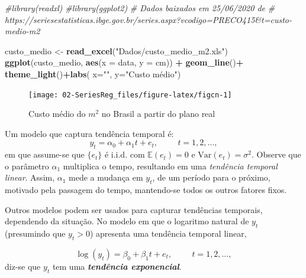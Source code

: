 \documentclass[
]{book}
\newenvironment{Shaded}{\begin{snugshade}}{\end{snugshade}}
\newcommand{\CommentTok}[1]{\textcolor[rgb]{0.56,0.35,0.01}{\textit{#1}}}
\newcommand{\DataTypeTok}[1]{\textcolor[rgb]{0.13,0.29,0.53}{#1}}
\newcommand{\KeywordTok}[1]{\textcolor[rgb]{0.13,0.29,0.53}{\textbf{#1}}}
\newcommand{\NormalTok}[1]{#1}
\newcommand{\OperatorTok}[1]{\textcolor[rgb]{0.81,0.36,0.00}{\textbf{#1}}}
\newcommand{\StringTok}[1]{\textcolor[rgb]{0.31,0.60,0.02}{#1}}
\theoremstyle{definition}
\theoremstyle{definition}
\theoremstyle{definition}
\theoremstyle{remark}
\begin{document}
\begin{Shaded}
\begin{Highlighting}[]
\CommentTok{#library(readxl)}
\CommentTok{#library(ggplot2)}
\CommentTok{# Dados baixados em 25/06/2020 de}
\CommentTok{# https://seriesestatisticas.ibge.gov.br/series.aspx?vcodigo=PRECO415&t=custo-medio-m2}

\NormalTok{custo_medio <-}\StringTok{ }\KeywordTok{read_excel}\NormalTok{(}\StringTok{"Dados/custo_medio_m2.xls"}\NormalTok{)}
\KeywordTok{ggplot}\NormalTok{(custo_medio, }\KeywordTok{aes}\NormalTok{(}\DataTypeTok{x =}\NormalTok{ data, }\DataTypeTok{y =}\NormalTok{ cm)) }\OperatorTok{+}\StringTok{ }
\StringTok{  }\KeywordTok{geom_line}\NormalTok{()}\OperatorTok{+}\StringTok{ }\KeywordTok{theme_light}\NormalTok{()}\OperatorTok{+}\KeywordTok{labs}\NormalTok{( }\DataTypeTok{x=}\StringTok{""}\NormalTok{, }\DataTypeTok{y=}\StringTok{"Custo médio"}\NormalTok{)}
\end{Highlighting}
\end{Shaded}

\begin{figure}

{\centering \texttt{[image: 02-SeriesReg\_files/figure-latex/figcn-1]} 

}

\caption{Custo médio do $m^2$ no Brasil a partir do plano real}\label{fig:figcn}
\end{figure}

Um modelo que captura tendência temporal é:
\begin{equation}
y_t = \alpha_0+ \alpha_1t + e_t, \hspace{1cm} t = 1, 2, \ldots,
\label{eq:tendmodel}
\end{equation}
em que assume-se que \(\{e_t\}\) é i.i.d. com \(\mathbb{E}(e_t)=0\) e \(\mbox{Var}(e_t)=\sigma^2\).
Observe que o parâmetro \(\alpha_1\) multiplica o tempo, resultando em uma \emph{tendência temporal linear}. Assim, \(\alpha_1\) mede a mudança em \(y_t\), de um período para o próximo, motivado pela passagem do tempo, mantendo-se todos os outros fatores fixos.

Outros modelos podem ser usados para capturar tendências temporais, dependendo da situação.
No modelo em que o logaritmo natural de \(y_t\) (presumindo que \(y_t>0\)) apresenta uma tendência temporal linear,

\begin{equation}
\log(y_t) = \beta_0+ \beta_1t + e_t, \hspace{1cm} t = 1, 2, \ldots,
\label{eq:logtend}
\end{equation}
diz-se que \(y_t\) tem uma \textbf{\emph{tendência exponencial}}.
\end{document}
